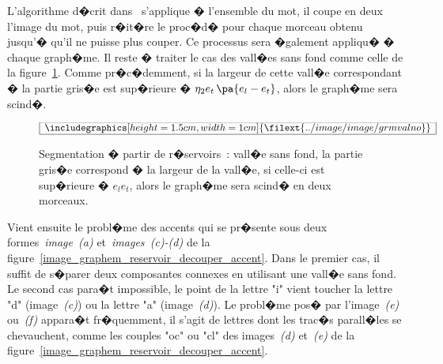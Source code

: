 \label{image_valley_eta}    

L'algorithme d�crit dans~ s'applique � l'ensemble du mot, il coupe en deux l'image du mot, puis r�it�re le proc�d� pour chaque morceau obtenu jusqu'� qu'il ne puisse plus couper. Ce processus sera �galement appliqu� � chaque graph�me. Il reste � traiter le cas des vall�es sans fond comme celle de la figure~\ref{image_graphem_reservoir_vallee_sans_fond}. Comme pr�c�demment, si la largeur de cette vall�e correspondant � la partie gris�e est sup�rieure � $\eta_2 e_t \, \pa{e_l - e_t}$, alors le graph�me sera scind�.



            \begin{figure}[ht]
        $$\frame{$\begin{array}[c]{c}\includegraphics[height=1.5cm, width=1cm]
        {\filext{../image/image/grmvalno}}\end{array}$}$$
        \caption{    Segmentation � partir de r�servoirs~: vall�e sans fond, la partie gris�e correspond � la 
                            largeur de la vall�e, si celle-ci est sup�rieure � $e_l e_t$, alors le graph�me sera
                            scind� en deux morceaux. }
        \label{image_graphem_reservoir_vallee_sans_fond}
            \end{figure}
            


Vient ensuite le probl�me des accents qui se pr�sente sous deux formes~\textit{image~(a)} et~\textit{images~(c)-(d)} de la figure~\ref{image_graphem_reservoir_decouper_accent}. Dans le premier cas, il suffit de s�parer deux composantes connexes en utilisant une vall�e sans fond. Le second cas para�t impossible, le point de la lettre "i" vient toucher la lettre "d" (image~\textit{(c)}) ou la lettre "a" (image~\textit{(d)}). Le probl�me pos� par l'image~\textit{(e)} ou~\textit{(f)} appara�t fr�quemment, il s'agit de lettres dont les trac�s parall�les se chevauchent, comme les couples "oc" ou "cl" des images~\textit{(d)} et~\textit{(e)} de la figure~\ref{image_graphem_reservoir_decouper_accent}.

